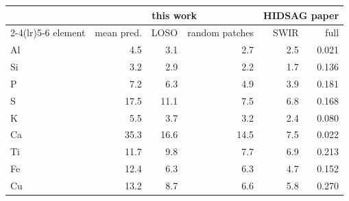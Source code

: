\begin{tabular}{lrrrrr}
\toprule
& \multicolumn{3}{c}{this work} & \multicolumn{2}{c}{HIDSAG paper} \\ \cmidrule(lr){2-4}\cmidrule(lr){5-6}
element & mean pred. & LOSO & random patches & SWIR & full \\
\midrule
Al & 4.5 & 3.1 & 2.7 & 2.5 & 0.021 \\
Si & 3.2 & 2.9 & 2.2 & 1.7 & 0.136 \\
P & 7.2 & 6.3 & 4.9 & 3.9 & 0.181 \\
S & 17.5 & 11.1 & 7.5 & 6.8 & 0.168 \\
K & 5.5 & 3.7 & 3.2 & 2.4 & 0.080 \\
Ca & 35.3 & 16.6 & 14.5 & 7.5 & 0.022 \\
Ti & 11.7 & 9.8 & 7.7 & 6.9 & 0.213 \\
Fe & 12.4 & 6.3 & 6.3 & 4.7 & 0.152 \\
Cu & 13.2 & 8.7 & 6.6 & 5.8 & 0.270 \\
\bottomrule
\end{tabular}
